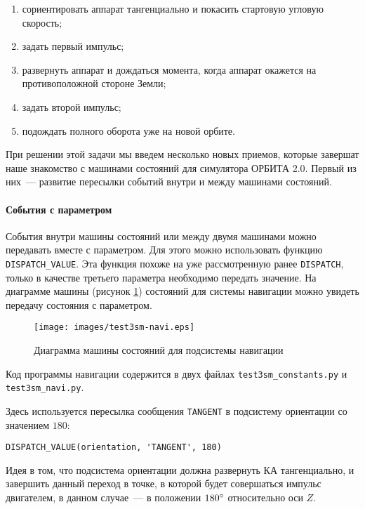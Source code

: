 \documentclass[12pt,a4paper]{article}
\begin{document}
\begin{enumerate}
\item сориентировать аппарат тангенциально и покасить стартовую угловую скорость;
\item задать первый импульс;
\item развернуть аппарат и дождаться момента, когда аппарат окажется на противоположной
  стороне Земли;
\item задать второй импульс;
\item подождать полного оборота уже на новой орбите.
\end{enumerate}

При решении этой задачи мы введем несколько новых приемов, которые завершат наше
знакомство с машинами состояний для симулятора ОРБИТА 2.0. Первый из них~--- развитие
пересылки событий внутри и между машинами состояний.

\paragraph{События с параметром}

События внутри машины состояний или между двумя машинами можно передавать вместе с
параметром. Для этого можно использовать функцию \verb'DISPATCH_VALUE'. Эта функция похоже
на уже рассмотренную ранее \verb'DISPATCH', только в качестве третьего параметра
необходимо передать значение. На диаграмме машины (рисунок \ref{Pic:Test3SM-Navi})
состояний для системы навигации можно увидеть передачу состояния с параметром.

\begin{figure}[tbh]
  \begin{center}
    \texttt{[image: images/test3sm-navi.eps]}
    \caption{Диаграмма машины состояний для подсистемы навигации}
    \label{Pic:Test3SM-Navi}
  \end{center}
\end{figure}

\label{MULTIPLE_MODULES}
Код программы навигации содержится в двух файлах \verb'test3sm_constants.py' и
\verb'test3sm_navi.py'.

Здесь используется пересылка сообщения \verb'TANGENT' в подсистему ориентации со значением
$180$: 

\begin{verbatim}
DISPATCH_VALUE(orientation, 'TANGENT', 180)
\end{verbatim}

Идея в том, что подсистема ориентации должна развернуть КА тангенциально, и завершить
данный переход в точке, в которой будет совершаться импульс двигателем, в данном
случае~--- в положении $180 \degree$ относительно оси $Z$.
\end{document}
